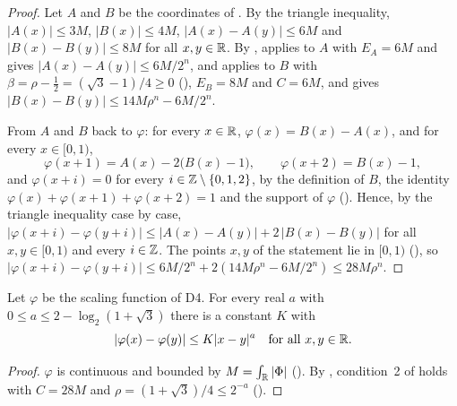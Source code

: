 \begin{proof}
\leanok
{}
Let $A$ and $B$ be the coordinates of . By the triangle
inequality, $|A(x)| \leq 3M$, $|B(x)| \leq 4M$, $|A(x) - A(y)| \leq 6M$ and
$|B(x) - B(y)| \leq 8M$ for all $x, y \in \mathbb{R}$. By ,
 applies to $A$ with $E_A = 6M$ and gives
$|A(x) - A(y)| \leq 6M/2^n$, and  applies to $B$ with
$\beta = \rho - \frac12 = (\sqrt 3 - 1)/4 \geq 0$ (), $E_B = 8M$ and
$C = 6M$, and gives $|B(x) - B(y)| \leq 14 M \rho^n - 6M/2^n$.

From $A$ and $B$ back to $\varphi$: for every $x \in \mathbb{R}$, $\varphi(x) = B(x) - A(x)$, and for
every $x \in [0, 1)$,
\[
  \varphi(x + 1) = A(x) - 2 \bigl(B(x) - 1\bigr) , \qquad \varphi(x + 2) = B(x) - 1 ,
\]
and $\varphi(x + i) = 0$ for every $i \in \mathbb{Z} \setminus \{0, 1, 2\}$, by the definition of $B$,
the identity $\varphi(x) + \varphi(x + 1) + \varphi(x + 2) = 1$ and the support of $\varphi$
(). Hence, by the triangle inequality case by case,
$|\varphi(x + i) - \varphi(y + i)| \leq |A(x) - A(y)| + 2 \, |B(x) - B(y)|$ for all
$x, y \in [0, 1)$ and every $i \in \mathbb{Z}$. The points $x, y$ of the statement lie in $[0, 1)$
(), so
$|\varphi(x + i) - \varphi(y + i)| \leq 6M/2^n + 2 (14 M \rho^n - 6M/2^n) \leq 28 M \rho^n$.
\end{proof}

\begin{theorem}
\label{thm:daub-holder-d4}
\leanok
{}
Let $\varphi$ be the scaling function of D4. For every real $a$ with
$0 \leq a \leq 2 - \log_2(1 + \sqrt 3)$ there is a constant $K$ with
\[
  |\varphi(x) - \varphi(y)| \leq K |x - y|^a \quad\text{for all } x, y \in \mathbb{R} .
\]
\end{theorem}

\begin{proof}
\leanok
{}
$\varphi$ is continuous and bounded by $M = \int_{\mathbb{R}} |\Phi|$
(). By , condition~2 of
 holds with $C = 28M$ and $\rho = (1 + \sqrt 3)/4 \leq 2^{-a}$
().
\end{proof}

